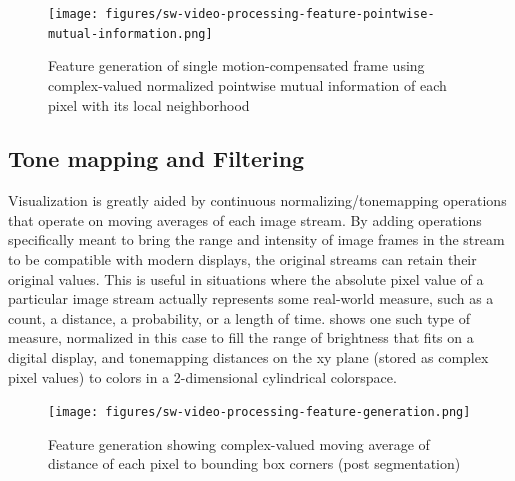 \begin{figure}[htb]\centering
	\texttt{[image: figures/sw-video-processing-feature-pointwise-mutual-information.png]}
	\caption{Feature generation of single motion-compensated frame using complex-valued normalized pointwise mutual information of each pixel with its local neighborhood}
\end{figure}


\subsection{Tone mapping and Filtering}\label{sec:tonemapping-and-filtering}

Visualization is greatly aided by continuous normalizing/tonemapping operations that operate on moving averages of each image stream.
By adding operations specifically meant to bring the range and intensity of image frames in the stream to be compatible with modern displays, the original streams can retain their original values.
This is useful in situations where the absolute pixel value of a particular image stream actually represents some real-world measure, such as a count, a distance, a probability, or a length of time.
 shows one such type of measure, normalized in this case to fill the range of brightness that fits on a digital display, and tonemapping distances on the xy plane (stored as complex pixel values) to colors in a 2-dimensional cylindrical colorspace.

\begin{figure}[htb]\centering
	\texttt{[image: figures/sw-video-processing-feature-generation.png]}
	\caption{Feature generation showing complex-valued moving average of distance of each pixel to bounding box corners (post segmentation)}
    \label{fig:distance-to-bbox-corner}
\end{figure}










% 

\clearpage{}
